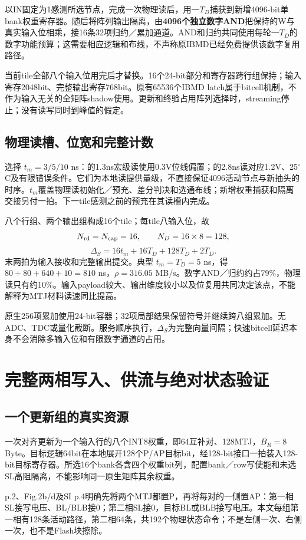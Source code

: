 以IN固定为1感测所选节点，完成一次物理读后，用一$T_D$捕获到新增4096-bit单bank权重寄存器。随后将阵列输出隔离，由\textbf{4096个独立数字AND}把保持的W与真实输入位相乘，接16条32项归约／累加通道。AND和归约共同使用每轮一$T_D$的数字功能预算；这需要相应逻辑和布线，不声称原IBMD已经免费提供该数字复用路径。

当前tile全部八个输入位用完后才替换。16个24-bit部分和寄存器跨行组保持；输入寄存2048bit、完整输出寄存768bit。原有65536个IBMD latch属于bitcell机制，不作为输入无关的全矩阵shadow使用。更新和终验占用阵列选择时，streaming停止；没有读写同时到峰值的假定。

\subsection{物理读槽、位宽和完整计数}
选择 $t_m=3/5/10$ ns：的1.3ns宏级读使用0.3V位线偏置；的2.8ns读对应1.2V、25$^\circ$C及有限错误条件。它们为本地读提供量级，不直接保证4096活动节点与新抽头的时序。$t_m$覆盖物理读初始化／预充、差分判决和选通布线；新增权重捕获和隔离交接另付一拍。下一tile感测之前的预充在其读槽内完成。

八个行组、两个输出组构成16个tile；每tile八输入位，故
\[
N_{\rm rd}=N_{\rm cap}=16,\qquad N_D=16\times8=128,
\]
\[
\boxed{\Delta_S=16t_m+16T_D+128T_D+2T_D.}
\]
末两拍为输入接收和完整输出提交。典型 $t_m=T_D=5$ ns，得 $80+80+640+10=810$ ns，$\rho=316.05$ MB/s。数字AND／归约约占79\%，物理读只有约10\%。输入payload较大、输出维度较小以及位复用共同决定该点，不能解释为MTJ材料读速同比提高。

原生256项累加使用24-bit容器；32项局部结果保留符号并继续跨八组累加。无ADC、TDC或量化截断。服务顺序执行，$\Delta_S$为完整向量间隔；快速bitcell延迟本身不会消除多输入位和有限数字通道的占用。

\clearpage
\section{完整两相写入、供流与绝对状态验证}

\subsection{一个更新组的真实资源}
一次对齐更新为一个输入行的八个INT8权重，即64互补对、128MTJ，$B_R=8$ Byte。目标逻辑64bit在本地展开128个P/AP目标bit，经128-bit接口一拍装入128-bit目标寄存器。所选16个bank各含四个权重bit列，配置bank／row写使能和未选SL高阻隔离，不能影响同一原生矩阵其余权重。

 p.2、Fig.2b/d及SI p.4明确先将两个MTJ都置P，再将每对的一侧置AP：第一相SL接写电压、BL/BLB接0；第二相SL接0，目标BL或BLB接写电压。本文每组第一相有128条活动路径，第二相64条，共192个物理状态命令；不是左侧一次、右侧一次，也不是Flash块擦除。

